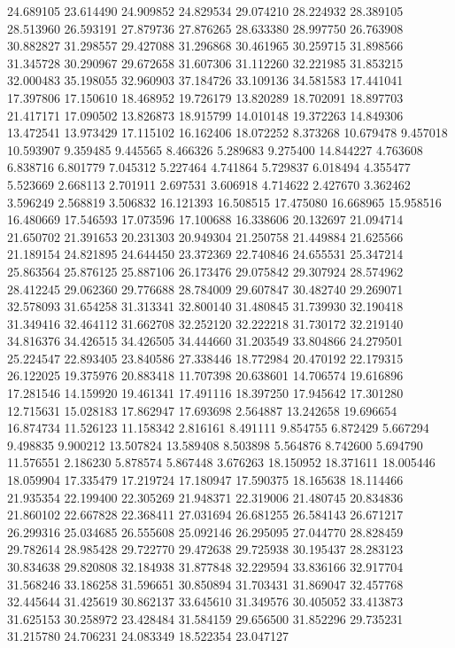 24.689105
23.614490
24.909852
24.829534
29.074210
28.224932
28.389105
28.513960
26.593191
27.879736
27.876265
28.633380
28.997750
26.763908
30.882827
31.298557
29.427088
31.296868
30.461965
30.259715
31.898566
31.345728
30.290967
29.672658
31.607306
31.112260
32.221985
31.853215
32.000483
35.198055
32.960903
37.184726
33.109136
34.581583
17.441041
17.397806
17.150610
18.468952
19.726179
13.820289
18.702091
18.897703
21.417171
17.090502
13.826873
18.915799
14.010148
19.372263
14.849306
13.472541
13.973429
17.115102
16.162406
18.072252
8.373268
10.679478
9.457018
10.593907
9.359485
9.445565
8.466326
5.289683
9.275400
14.844227
4.763608
6.838716
6.801779
7.045312
5.227464
4.741864
5.729837
6.018494
4.355477
5.523669
2.668113
2.701911
2.697531
3.606918
4.714622
2.427670
3.362462
3.596249
2.568819
3.506832
16.121393
16.508515
17.475080
16.668965
15.958516
16.480669
17.546593
17.073596
17.100688
16.338606
20.132697
21.094714
21.650702
21.391653
20.231303
20.949304
21.250758
21.449884
21.625566
21.189154
24.821895
24.644450
23.372369
22.740846
24.655531
25.347214
25.863564
25.876125
25.887106
26.173476
29.075842
29.307924
28.574962
28.412245
29.062360
29.776688
28.784009
29.607847
30.482740
29.269071
32.578093
31.654258
31.313341
32.800140
31.480845
31.739930
32.190418
31.349416
32.464112
31.662708
32.252120
32.222218
31.730172
32.219140
34.816376
34.426515
34.426505
34.444660
31.203549
33.804866
24.279501
25.224547
22.893405
23.840586
27.338446
18.772984
20.470192
22.179315
26.122025
19.375976
20.883418
11.707398
20.638601
14.706574
19.616896
17.281546
14.159920
19.461341
17.491116
18.397250
17.945642
17.301280
12.715631
15.028183
17.862947
17.693698
2.564887
13.242658
19.696654
16.874734
11.526123
11.158342
2.816161
8.491111
9.854755
6.872429
5.667294
9.498835
9.900212
13.507824
13.589408
8.503898
5.564876
8.742600
5.694790
11.576551
2.186230
5.878574
5.867448
3.676263
18.150952
18.371611
18.005446
18.059904
17.335479
17.219724
17.180947
17.590375
18.165638
18.114466
21.935354
22.199400
22.305269
21.948371
22.319006
21.480745
20.834836
21.860102
22.667828
22.368411
27.031694
26.681255
26.584143
26.671217
26.299316
25.034685
26.555608
25.092146
26.295095
27.044770
28.828459
29.782614
28.985428
29.722770
29.472638
29.725938
30.195437
28.283123
30.834638
29.820808
32.184938
31.877848
32.229594
33.836166
32.917704
31.568246
33.186258
31.596651
30.850894
31.703431
31.869047
32.457768
32.445644
31.425619
30.862137
33.645610
31.349576
30.405052
33.413873
31.625153
30.258972
23.428484
31.584159
29.656500
31.852296
29.735231
31.215780
24.706231
24.083349
18.522354
23.047127
